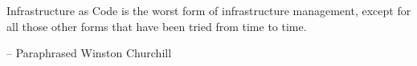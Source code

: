 \begin{oldquote}
Infrastructure as Code is the worst form of infrastructure management, except for all those other forms that have been tried from time to time.

\raggedleft -- Paraphrased Winston Churchill
\end{oldquote}

